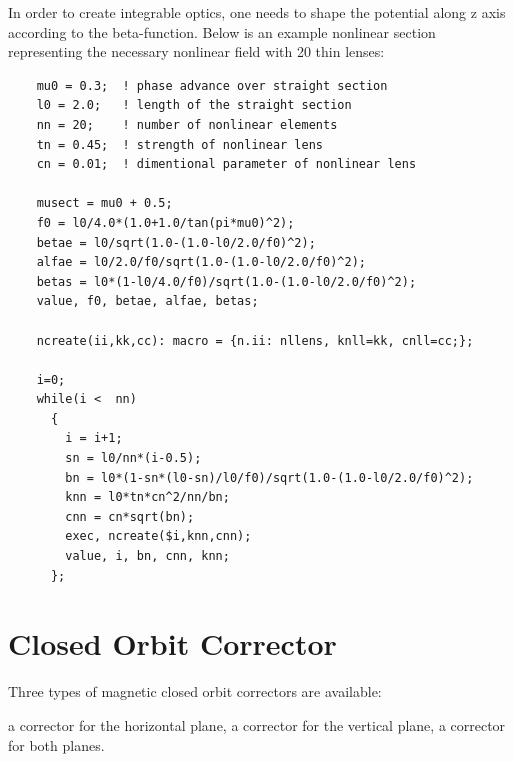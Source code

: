 In order to create integrable optics, one needs to shape the potential
along z axis according to the beta-function. Below is an example
nonlinear section representing the necessary nonlinear field with 20
thin lenses:  
\begin{verbatim}
    mu0 = 0.3;  ! phase advance over straight section
    l0 = 2.0;   ! length of the straight section
    nn = 20;    ! number of nonlinear elements
    tn = 0.45;  ! strength of nonlinear lens
    cn = 0.01;  ! dimentional parameter of nonlinear lens

    musect = mu0 + 0.5;
    f0 = l0/4.0*(1.0+1.0/tan(pi*mu0)^2);
    betae = l0/sqrt(1.0-(1.0-l0/2.0/f0)^2);
    alfae = l0/2.0/f0/sqrt(1.0-(1.0-l0/2.0/f0)^2);
    betas = l0*(1-l0/4.0/f0)/sqrt(1.0-(1.0-l0/2.0/f0)^2);
    value, f0, betae, alfae, betas;

    ncreate(ii,kk,cc): macro = {n.ii: nllens, knll=kk, cnll=cc;};

    i=0;
    while(i <  nn)
      {
        i = i+1;
        sn = l0/nn*(i-0.5);
        bn = l0*(1-sn*(l0-sn)/l0/f0)/sqrt(1.0-(1.0-l0/2.0/f0)^2);
        knn = l0*tn*cn^2/nn/bn;
        cnn = cn*sqrt(bn);
        exec, ncreate($i,knn,cnn);
        value, i, bn, cnn, knn;
      };
\end{verbatim}


  



\section{Closed Orbit Corrector}
\label{sec:closed-orbit-cor}\label{sec:kicker}

Three types of magnetic closed orbit correctors are available: 
\begin{madlist}
    a corrector for the horizontal plane, 
    a corrector for the vertical plane, 
    a corrector for both planes. 
\end{madlist}

